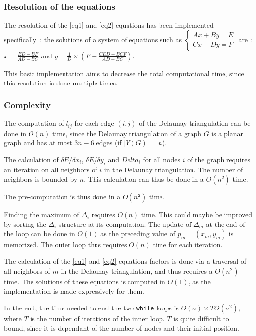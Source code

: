 \documentclass[12pt]{report}
\begin{document}
\subsubsection{Resolution of the equations}

The resolution of the \ref{eq1} and \ref{eq2} equations has been implemented specifically~: the solutions of a system of equations such as 
$\begin{cases}
Ax + By = E \\
C x + Dy = F
\end{cases}$
are : $x = \frac{ED - BF}{AD - BC}$ and $y = \frac{1}{D} \times(F - \frac{CED - BCF}{AD- BC})$.

This basic implementation aims to decrease the total computational time, since this resolution is done multiple times.

\subsubsection{Complexity}

The computation of $l_{ij}$ for each edge $(i,j)$ of the Delaunay triangulation can be done in $O(n)$ time, since the Delaunay triangulation of a graph $G$ is a planar graph and has at most $3n -6$ edges (if $|V(G)| = n$).

The calculation of  $\delta E / \delta x_i$, $\delta E / \delta y_i$ and $Delta_i$ for all nodes $i$ of the graph requires an iteration on all neighbors of $i$ in the Delaunay triangulation. The number of neighbors is bounded by $n$. This calculation can thus be done in a $O(n^2)$ time.

The pre-computation is thus done in a $O(n^2)$ time.

Finding the maximum of $\Delta_i$ requires $O(n)$ time. This could maybe be improved by sorting the $\Delta_i$ structure at its computation. The update of $\Delta_m$ at the end of the loop can be done in $O(1)$ as the preceding value of $p_m = (x_m, y_m)$ is memorized. The outer loop thus requires $O(n)$ time for each iteration.

The calculation of the \ref{eq1} and \ref{eq2} equations factors is done via a traversal of all neighbors of $m$ in the Delaunay triangulation, and thus requires a $O(n^2)$ time.
The solutions of these equations is computed in $O(1)$, as the implementation is made expressively for them.

In the end, the time needed to end the two \texttt{while} loops is $O(n) \times T O(n^2)$, where $T$ is the number of iterations of the inner loop. $T$ is quite difficult to bound, since it is dependant of the number of nodes and their initial position.
\end{document}
